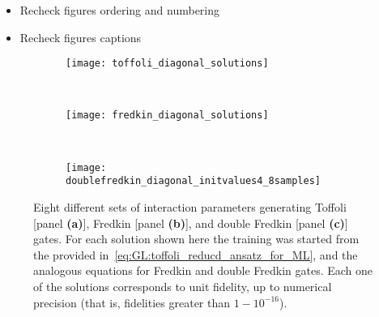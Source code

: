 \begin{itemize}
    \item Recheck figures ordering and numbering
    \item Recheck figures captions
\end{itemize}


\begin{figure}[tb]
    \vspace{-50pt}
    \begin{subfigure}{\textwidth}
        \centering
        \caption{}
        \label{fig:GL:toffoli_diagonal_solutions}
        \texttt{[image: toffoli\_diagonal\_solutions]}
    \end{subfigure} \\
    \begin{subfigure}{\textwidth}
        \centering
        \caption{}
        \label{fig:GL:fredkin_diagonal_solutions}
        \texttt{[image: fredkin\_diagonal\_solutions]}
    \end{subfigure} \\
    \begin{subfigure}{\textwidth}
        \centering
        \caption{}
        \label{fig:GL:doublefredkin_diagonal_solutions}
        \texttt{[image: doublefredkin\_diagonal\_initvalues4\_8samples]}
    \end{subfigure}
    \caption{
        Eight different sets of interaction parameters generating Toffoli [panel \textbf{(a)}], Fredkin [panel \textbf{(b)}], and double Fredkin [panel \textbf{(c)}] gates. For each solution shown here the training was started from the \ansatz provided in~\cref{eq:GL:toffoli_reducd_ansatz_for_ML}, and the analogous equations for Fredkin and double Fredkin gates.
        Each one of the solutions corresponds to unit fidelity, up to numerical precision (that is, fidelities greater than $1-10^{-16}$).
    }
    \label{fig:GL:toffoli_diagonal_solutions}
\end{figure}

